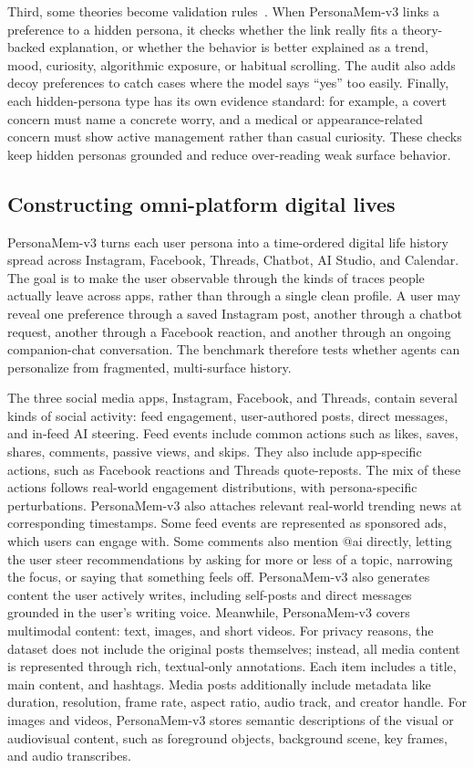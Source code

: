 \documentclass[]{fairmeta}
\begin{document}
Third, some theories become validation rules~\citep{goffman1959presentation,horton1956mass,barthes1981camera,rosenstock1974historical}. When PersonaMem-v3 links a preference to a hidden persona, it checks whether the link really fits a theory-backed explanation, or whether the behavior is better explained as a trend, mood, curiosity, algorithmic exposure, or habitual scrolling. The audit also adds decoy preferences to catch cases where the model says “yes” too easily. Finally, each hidden-persona type has its own evidence standard: for example, a covert concern must name a concrete worry, and a medical or appearance-related concern must show active management rather than casual curiosity. These checks keep hidden personas grounded and reduce over-reading weak surface behavior.

\subsection{Constructing omni-platform digital lives}
PersonaMem-v3 turns each user persona into a time-ordered digital life history spread across Instagram, Facebook, Threads, Chatbot, AI Studio, and Calendar. The goal is to make the user observable through the kinds of traces people actually leave across apps, rather than through a single clean profile. A user may reveal one preference through a saved Instagram post, another through a chatbot request, another through a Facebook reaction, and another through an ongoing companion-chat conversation. The benchmark therefore tests whether agents can personalize from fragmented, multi-surface history.

The three social media apps, Instagram, Facebook, and Threads, contain several kinds of social activity: feed engagement, user-authored posts, direct messages, and in-feed AI steering. Feed events include common actions such as likes, saves, shares, comments, passive views, and skips. They also include app-specific actions, such as Facebook reactions and Threads quote-reposts. The mix of these actions follows real-world engagement distributions, with persona-specific perturbations. PersonaMem-v3 also attaches relevant real-world trending news at corresponding timestamps. Some feed events are represented as sponsored ads, which users can engage with. Some comments also mention $@$ai directly, letting the user steer recommendations by asking for more or less of a topic, narrowing the focus, or saying that something feels off. PersonaMem-v3 also generates content the user actively writes, including self-posts and direct messages grounded in the user’s writing voice. Meanwhile, PersonaMem-v3 covers multimodal content: text, images, and short videos. For privacy reasons, the dataset does not include the original posts themselves; instead, all media content is represented through rich, textual-only annotations. Each item includes a title, main content, and hashtags. Media posts additionally include metadata like duration, resolution, frame rate, aspect ratio, audio track, and creator handle. For images and videos, PersonaMem-v3 stores semantic descriptions of the visual or audiovisual content, such as foreground objects, background scene, key frames, and audio transcribes.
\end{document}
